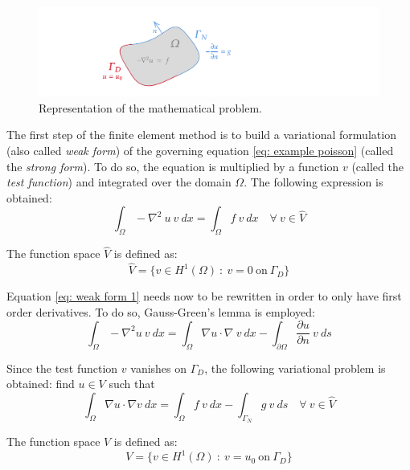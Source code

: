 \begin{figure} [h]
    \centering
    \includegraphics[trim=50 0 200 0, clip, width=0.7\linewidth]{Figures/Chapter2/finite_element_problem_sketch.pdf}
    \caption{Representation of the mathematical problem.}
\end{figure}

The first step of the finite element method is to build a variational formulation (also called \textit{weak form}) of the governing equation \ref{eq: example poisson} (called the \textit{strong form}).
To do so, the equation is multiplied by a function $v$ (called the \textit{test function}) and integrated over the domain $\Omega$.
The following expression is obtained:
\begin{equation}
    \int_{\Omega} -\nabla^2 \ u \ v \ dx = \int_{\Omega} f \ v \ dx \quad \forall \ v \in \hat{V}
    \label{eq: weak form 1}
\end{equation}

The function space $\hat{V}$ is defined as:
\begin{equation}
    \hat{V} = \{ v \in H^1(\Omega) \ : \ v=0 \ \text{on} \ \Gamma_D \}
\end{equation}

Equation \ref{eq: weak form 1} needs now to be rewritten in order to only have first order derivatives.
To do so, Gauss-Green's lemma is employed:
\begin{equation}
    \int_{\Omega} -\nabla^2 u \ v \ dx = \int_{\Omega} \nabla u \cdot \nabla \ v \ dx - \int_{\partial \Omega} \frac{\partial u}{\partial n} \ v \ ds
    \label{eq: gauss-green}
\end{equation}

Since the test function $v$ vanishes on $\Gamma_D$, the following variational problem is obtained: find $u \in V$ such that
\begin{equation}
    \int_{\Omega} \nabla u \cdot \nabla v  \ dx = \int_{\Omega} f \ v \ dx - \int_{\Gamma_N} g \ v \ ds \quad \forall \ v \in \hat{V}
    \label{eq: weak form 2}
\end{equation}

The function space $V$ is defined as:
\begin{equation}
    V = \{ v \in H^1(\Omega) \ : \ v=u_0 \ \text{on} \ \Gamma_D \}
\end{equation}

